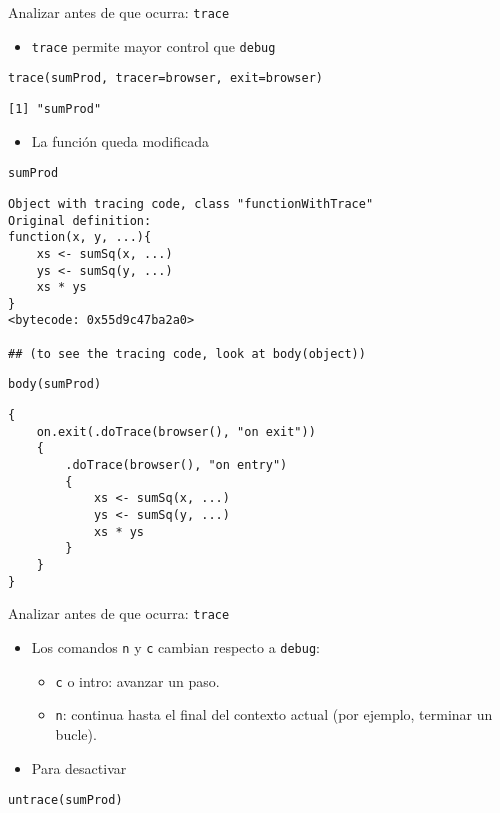 \documentclass[xcolor={usenames,svgnames,dvipsnames}]{beamer}
\begin{document}
\begin{frame}[label={sec:orgd8c7bc7},fragile]{Analizar antes de que ocurra: \texttt{trace}}
 \begin{itemize}
\item \texttt{trace} permite mayor control que \texttt{debug}
\end{itemize}
\lstset{language=r,label= ,caption= ,captionpos=b,numbers=none}
\begin{lstlisting}
trace(sumProd, tracer=browser, exit=browser)
\end{lstlisting}

\begin{verbatim}
[1] "sumProd"
\end{verbatim}


\begin{itemize}
\item La función queda modificada
\end{itemize}
\lstset{language=r,label= ,caption= ,captionpos=b,numbers=none}
\begin{lstlisting}
sumProd
\end{lstlisting}

\begin{verbatim}
Object with tracing code, class "functionWithTrace"
Original definition: 
function(x, y, ...){
    xs <- sumSq(x, ...)
    ys <- sumSq(y, ...)
    xs * ys
}
<bytecode: 0x55d9c47ba2a0>

## (to see the tracing code, look at body(object))
\end{verbatim}

\lstset{language=r,label= ,caption= ,captionpos=b,numbers=none}
\begin{lstlisting}
body(sumProd)
\end{lstlisting}

\begin{verbatim}
{
    on.exit(.doTrace(browser(), "on exit"))
    {
        .doTrace(browser(), "on entry")
        {
            xs <- sumSq(x, ...)
            ys <- sumSq(y, ...)
            xs * ys
        }
    }
}
\end{verbatim}
\end{frame}

\begin{frame}[label={sec:orgd261dc8},fragile]{Analizar antes de que ocurra: \texttt{trace}}
 \begin{itemize}
\item Los comandos \texttt{n} y \texttt{c} cambian respecto a \texttt{debug}:
\begin{itemize}
\item \texttt{c} o intro: avanzar un paso.
\item \texttt{n}: continua hasta el final del contexto actual (por ejemplo,
terminar un bucle).
\end{itemize}
\item Para desactivar
\end{itemize}
\lstset{language=r,label= ,caption= ,captionpos=b,numbers=none}
\begin{lstlisting}
untrace(sumProd)
\end{lstlisting}
\end{frame}
\end{document}
